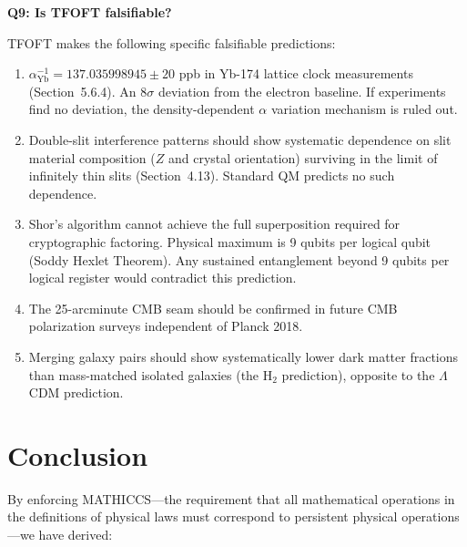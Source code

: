 \documentclass[11pt,a4paper]{article}
\begin{document}
\begin{mdframed}
\textbf{Q9: Is TFOFT falsifiable?}
\end{mdframed}

TFOFT makes the following specific falsifiable predictions:
\begin{enumerate}
  \item $\alpha^{-1}_{\text{Yb}} = 137.035998945 \pm 20$ ppb in Yb-174 lattice clock
        measurements (Section~5.6.4). An $8\sigma$ deviation from the electron
        baseline. If experiments find no deviation, the density-dependent $\alpha$
        variation mechanism is ruled out.
  \item Double-slit interference patterns should show systematic dependence on slit
        material composition ($Z$ and crystal orientation) surviving in the limit of
        infinitely thin slits (Section~4.13). Standard QM predicts no such dependence.
  \item Shor's algorithm cannot achieve the full superposition required for
        cryptographic factoring. Physical maximum is 9 qubits per logical qubit
        (Soddy Hexlet Theorem). Any sustained entanglement beyond 9 qubits per
        logical register would contradict this prediction.
  \item The 25-arcminute CMB seam should be confirmed in future CMB polarization
        surveys independent of Planck 2018.
  \item Merging galaxy pairs should show systematically lower dark matter fractions
        than mass-matched isolated galaxies (the H$_2$ prediction), opposite to the
        $\Lambda$CDM prediction.
\end{enumerate}




\section{Conclusion}

By enforcing MATHICCS---the requirement that all mathematical operations in the
definitions of physical laws must correspond to persistent physical operations---we
have derived:
\end{document}
